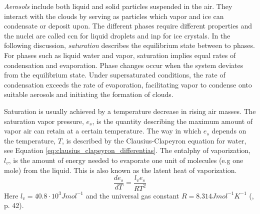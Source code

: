 \textit{Aerosols} include both liquid and solid particles suspended in the air. They interact with the clouds by serving as particles which vapor and ice can condensate or deposit upon. The different phases require different properties and the nuclei are called \acrfull{ccn} for liquid droplets and \acrfull{inp} for ice crystals. 
In the following discussion, \textit{saturation} describes the equilibrium state between to phases. %
For phases such as liquid water and vapor, saturation implies equal rates of condensation and evaporation. Phase changes occur when the system deviates from the equilibrium state. Under supersaturated conditions, the rate of condensation exceeds the rate of evaporation, facilitating vapor to condense onto suitable aerosols and initiating the formation of clouds. 

Saturation is usually achieved by a temperature decrease in rising air masses. The saturation vapor pressure, $e_s$, is the quantity describing the maximum amount of vapor air can retain at a certain temperature. The way in which $e_s$ depends on the temperature, $T$, is described by the Clausius-Clapeyron equation for water, see Equation \eqref{eq:clausius_clapeyron_differentias}. The entalphy of vaporization, $l_v$, is the amount of energy needed to evaporate one unit of molecules (e.g one mole) from the liquid. This is also known as the latent heat of vaporization. 
\begin{equation} \label{eq:clausius_clapeyron_differentias}
    \frac{de_s}{dT} = \frac{l_v e_s}{R T^2}
\end{equation}
Here $l_v = 40.8 \cdot 10^3 J mol^{-1}$ and the universal gas constant $R= 8.314 J mol^{-1} K^{-1}$ (\cite{cloud_phys_book_johanne}, p. 42). 

